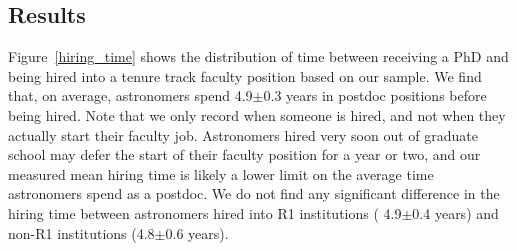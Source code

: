 \documentclass[modern]{aastex62}
\begin{document}
\subsection{Results}
Figure~\ref{hiring_time} shows the distribution of time between receiving a PhD and being hired into a tenure track faculty position based on our sample. We find that, on average, astronomers spend 4.9$\pm$0.3 years in postdoc positions before being hired. Note that we only record when someone is hired, and not when they actually start their faculty job. Astronomers hired very soon out of graduate school may defer the start of their faculty position for a year or two, and our measured mean hiring time is likely a lower limit on the average time astronomers spend as a postdoc. We do not find any significant difference in the hiring time between astronomers hired into R1 institutions ( 4.9$\pm$0.4 years) and non-R1 institutions (4.8$\pm$0.6 years). 
\end{document}
